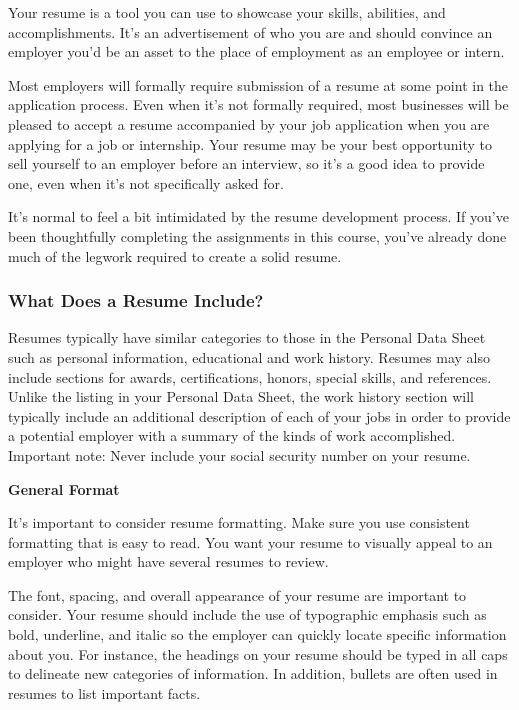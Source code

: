Your resume is a tool you can use to showcase your skills, abilities, and accomplishments. It's an advertisement of who you are and should convince an employer you'd be an asset to the place of employment as an employee or intern.

Most employers will formally require submission of a resume at some point in the application process. Even when it's not formally required, most businesses will be pleased to accept a resume accompanied by your job application when you are applying for a job or internship. Your resume may be your best opportunity to sell yourself to an employer before an interview, so it's a good idea to provide one, even when it's not specifically asked for.

It's normal to feel a bit intimidated by the resume development process. If you've been thoughtfully completing the assignments in this course, you've already done much of the legwork required to create a solid resume.

\subsubsection*{What Does a Resume Include?}

Resumes typically have similar categories to those in the Personal Data Sheet such as personal information, educational and work history. Resumes may also include sections for awards, certifications, honors, special skills, and references. Unlike the listing in your Personal Data Sheet, the work history section will typically include an additional description of each of your jobs in order to provide a potential employer with a summary of the kinds of work accomplished. Important note: Never include your social security number on your resume.

\textbf{General Format}

It's important to consider resume formatting. Make sure you use consistent formatting that is easy to read. You want your resume to visually appeal to an employer who might have several resumes to review.

The font, spacing, and overall appearance of your resume are important to consider. Your resume should include the use of typographic emphasis such as bold, underline, and italic so the employer can quickly locate specific information about you. For instance, the headings on your resume should be typed in all caps to delineate new categories of information. In addition, bullets are often used in resumes to list important facts.

